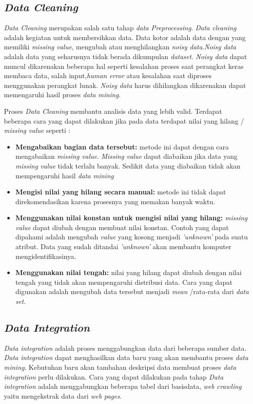 \subsection{\textit{Data Cleaning}}
\textit{Data Cleaning} merupakan salah satu tahap \textit{data Preprocessing}. \textit{Data cleaning} adalah kegiatan untuk membersihkan data. Data kotor adalah data dengan yang memiliki \textit{missing value}, mengubah atau menghilangkan \textit{noisy data}.\textit{Noisy data} adalah data yang seharusnya tidak berada dikumpulan \textit{dataset}. \textit{Noisy data} dapat muncul dikarenakan beberapa hal seperti kesalahan proses saat perangkat keras membaca data, salah input,\textit{human error} atau kesalahan saat diproses menggunakan perangkat lunak. \textit{Noisy data} harus dihilangkan dikarenakan dapat memengaruhi hasil proses \textit{data mining}.

 Proses \textit{Data Cleaning} membantu analisis data yang lebih valid. Terdapat beberapa cara yang dapat dilakukan jika pada data terdapat nilai yang hilang / \textit{missing value} seperti :

\begin{itemize}
\item \textbf{Mengabaikan bagian data tersebut:} metode ini dapat dengan cara mengabaikan \textit{missing value}. \textit{Missing value} dapat diabaikan jika data yang \textit{missing value} tidak terlalu banyak. Sedikit data yang diabaikan tidak akan mempengaruhi hasil \textit{data mining}
\item \textbf{Mengisi nilai yang hilang secara manual:} metode ini tidak dapat direkomendasikan karena prosesnya yang memakan banyak waktu.
\item \textbf{Menggunakan nilai konstan untuk mengisi nilai yang hilang:} \textit{missing value} dapat diubah dengan membuat nilai konstan. Contoh yang dapat dipahami adalah mengubah \textit{value} yang kosong menjadi \textit{'unknown'} pada suatu atribut. Data yang sudah ditandai \textit{'unknown'} akan membantu komputer mengidentifikasinya. 
\item \textbf{Menggunakan nilai tengah:} nilai yang hilang dapat diubah dengan nilai tengah yang tidak akan mempengaruhi distribusi data. Cara yang dapat digunakan adalah mengubah data tersebut menjadi \textit{mean} /rata-rata  dari \textit{data set}.
\end{itemize}


\subsection{\textit{Data Integration}} 
\textit{Data integration} adalah proses menggabungkan data dari beberapa sumber data. \textit{Data integration} dapat menghasilkan data baru yang akan membantu proses \textit{data mining}. Kebutuhan baru akan tambahan deskripsi data membuat proses \textit{data integration} perlu dilakukan. Cara yang dapat dilakukan pada tahap \textit{Data integration} adalah menggabungkan beberapa tabel dari basisdata, \textit{web crawling} yaitu mengekstrak data dari \textit{web pages}. 




